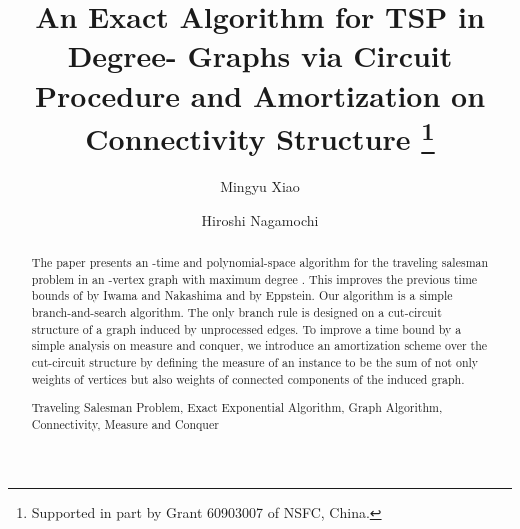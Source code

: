 \documentclass[runningheads]{llncs}
\begin{document}
\title{An Exact Algorithm for TSP in Degree- Graphs
via Circuit Procedure and Amortization on Connectivity Structure
\thanks{Supported in part by Grant
60903007 of NSFC, China.}
}

\author{Mingyu Xiao \and
Hiroshi Nagamochi}






\authorrunning{}



 \tocauthor{}
\maketitle

\begin{abstract}
The paper presents an -time and polynomial-space algorithm for the traveling salesman problem
 in an -vertex graph with maximum degree .
This improves the previous time bounds of
 by Iwama and Nakashima and  by Eppstein.
Our algorithm is a simple branch-and-search algorithm.
The only branch rule is designed on a cut-circuit structure of a graph induced by unprocessed edges.
To improve a time bound by a simple analysis on measure and conquer,
we introduce an amortization scheme over the cut-circuit structure
by defining the measure of an instance
to be the sum  of not only weights of vertices but also
weights of connected components of the induced graph.

\vspace{5mm} Traveling Salesman Problem, Exact Exponential Algorithm, Graph Algorithm, Connectivity, Measure and Conquer
\end{abstract}
\end{document}
